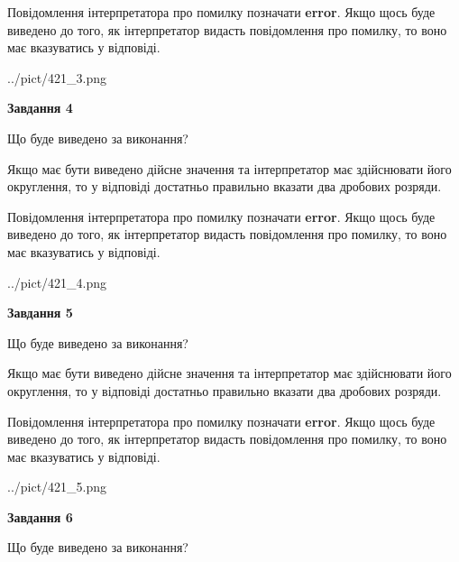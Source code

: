 \documentclass[12pt, ukrainian]{article}
\begin{document}
{\begin {Large}
Повідомлення інтерпретатора про помилку позначати \textbf{error}.
Якщо щось буде виведено до того, як інтерпретатор видасть повідомлення про помилку, 
то воно має вказуватись у відповіді. \par

\begin{center}
	{../pict/421_3.png}
\end{center}
\newpage

{\begin {center}\textbf{Завдання 4}\end {center}}\par
Що буде виведено за виконання? \par

Якщо має бути виведено дійсне значення та інтерпретатор має здійснювати його округлення, 
то у відповіді достатньо правильно вказати два дробових розряди.

Повідомлення інтерпретатора про помилку позначати \textbf{error}.
Якщо щось буде виведено до того, як інтерпретатор видасть повідомлення про помилку, 
то воно має вказуватись у відповіді. \par

\begin{center}
	{../pict/421_4.png}
\end{center}
\newpage

{\begin {center}\textbf{Завдання 5}\end {center}}\par
Що буде виведено за виконання? \par

Якщо має бути виведено дійсне значення та інтерпретатор має здійснювати його округлення, 
то у відповіді достатньо правильно вказати два дробових розряди.

Повідомлення інтерпретатора про помилку позначати \textbf{error}.
Якщо щось буде виведено до того, як інтерпретатор видасть повідомлення про помилку, 
то воно має вказуватись у відповіді. \par

\begin{center}
	{../pict/421_5.png}
\end{center}
\newpage

{\begin {center}\textbf{Завдання 6}\end {center}}\par
Що буде виведено за виконання? \par


\end{Large}}
\end{document}
